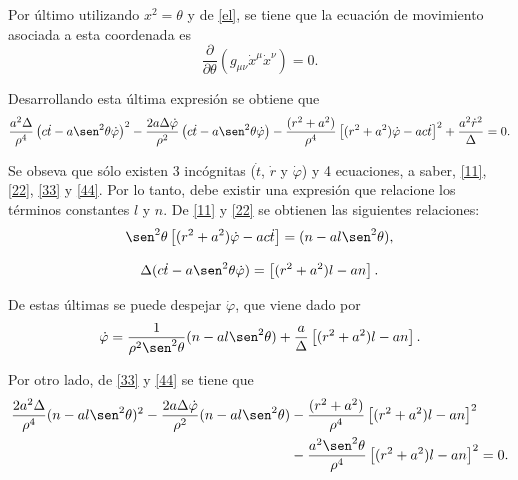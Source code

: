 Por \'ultimo utilizando $x^2=\theta$ y de \eqref{el}, se tiene que la ecuaci\'on de movimiento asociada a esta coordenada es
\begin{equation}
\frac{\partial }{\partial \theta}\left(g_{\mu \nu}\dot{x}^{\mu}\dot{x}^{\nu} \right)=0.
\end{equation} 

Desarrollando esta \'ultima expresi\'on se obtiene que
\begin{equation}\label{44}
\frac{a^2\Delta}{\rho^4}\left(c\dot{t}-a\sen^2 \theta \dot{\varphi} \right)^2-\frac{2a\Delta \dot{\varphi}}{\rho^2}\left(c\dot{t}-a\sen^2 \theta \dot{\varphi} \right)-\frac{(r^2+a^2)}{\rho^4}\left[(r^2+a^2)\dot{\varphi}-ac\dot{t} \right]^2+\frac{a^2\dot{r}^2}{\Delta}=0.
\end{equation}
 
Se obseva que s\'olo existen 3 inc\'ognitas ($\dot{t}$, $\dot{r}$ y $\dot{\varphi}$) y 4 ecuaciones, a saber, \eqref{11}, \eqref{22}, \eqref{33} y \eqref{44}. Por lo tanto, debe existir una expresi\'on que relacione los t\'erminos constantes $l$ y $n$. De \eqref{11} y \eqref{22} se obtienen las siguientes relaciones:
\begin{equation}\label{55}
\sen^2\theta \left[(r^2+a^2)\dot{\varphi}-ac\dot{t} \right]=(n-al\sen^2\theta),
\end{equation}
 
\begin{equation}\label{66}
\Delta(c\dot{t}-a\sen^2\theta\dot{\varphi})=\left[(r^2+a^2)l-an\right].
\end{equation}
 
De estas \'ultimas se puede despejar $\dot{\varphi}$, que viene dado por
\begin{equation}\label{77}
\dot{\varphi}=\frac{1}{\rho^2\sen^2\theta}(n-al\sen^2\theta)+\frac{a}{\Delta}\left[(r^2+a^2)l-an\right].
\end{equation}
 
 Por otro lado, de \eqref{33} y \eqref{44} se tiene que
 \begin{equation}\label{88}
 \begin{aligned}
 \frac{2a^2\Delta}{\rho^4}(n-al\sen^2\theta)^2-\frac{2a\Delta \dot{\varphi}}{\rho^2}(n-al\sen^2\theta)&-\frac{(r^2+a^2)}{\rho^4}\left[(r^2+a^2)l-an\right]^2\\
 &-\frac{a^2\sen^2\theta}{\rho^4}\left[(r^2+a^2)l-an\right]^2=0.\\
 \end{aligned}
 \end{equation}
 
